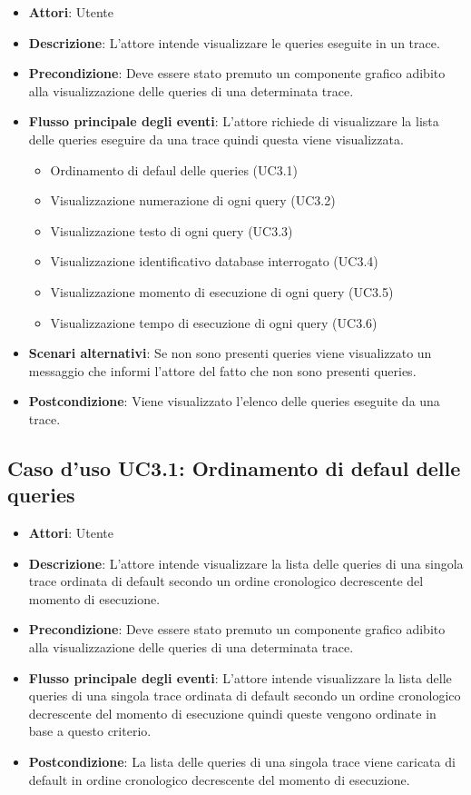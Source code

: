 \begin{itemize}
\item \textbf{Attori}: Utente
\item \textbf{Descrizione}: L'attore intende visualizzare le queries eseguite in un trace.
\item \textbf{Precondizione}: Deve essere stato premuto un componente grafico adibito alla visualizzazione delle queries di una determinata trace.
\item \textbf{Flusso principale degli eventi}: L'attore richiede di visualizzare la lista delle queries eseguire da una trace quindi questa viene visualizzata.
\begin{itemize}
\item Ordinamento di defaul delle queries (UC3.1)
\item Visualizzazione numerazione di ogni query (UC3.2)
\item Visualizzazione testo di ogni query (UC3.3)
\item Visualizzazione identificativo database interrogato (UC3.4)
\item Visualizzazione momento di esecuzione di ogni query (UC3.5)
\item Visualizzazione tempo di esecuzione di ogni query (UC3.6)
\end{itemize}
\item \textbf{Scenari alternativi}: Se non sono presenti queries viene visualizzato un messaggio che informi l'attore del fatto che non sono presenti queries.
\item \textbf{Postcondizione}: Viene visualizzato l'elenco delle queries eseguite da una trace.
\end{itemize}
\subsection{Caso d'uso UC3.1: Ordinamento di defaul delle queries}
\begin{itemize}
\item \textbf{Attori}: Utente
\item \textbf{Descrizione}: L'attore intende visualizzare la lista delle queries di una singola trace ordinata di default secondo un ordine cronologico decrescente del momento di esecuzione.
\item \textbf{Precondizione}: Deve essere stato premuto un componente grafico adibito alla visualizzazione delle queries di una determinata trace.
\item \textbf{Flusso principale degli eventi}: L'attore intende visualizzare la lista delle queries di una singola trace ordinata di default secondo un ordine cronologico decrescente del momento di esecuzione quindi queste vengono ordinate in base a questo criterio.
\item \textbf{Postcondizione}: La lista delle queries di una singola trace viene caricata di default in ordine cronologico decrescente del momento di esecuzione.
\end{itemize}
